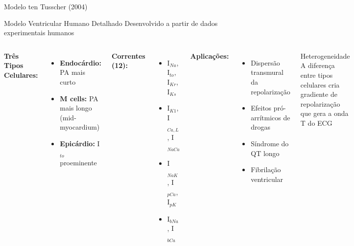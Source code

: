 \begin{frame}{Modelo ten Tusscher (2004)}
\begin{block}{Modelo Ventricular Humano Detalhado}
Desenvolvido a partir de dados experimentais humanos
\end{block}

\vspace{0.3cm}

\begin{columns}
\textbf{Três Tipos Celulares:}
\begin{itemize}
    \item \textbf{Endocárdio:} PA mais curto
    \item \textbf{M cells:} PA mais longo (mid-myocardium)
    \item \textbf{Epicárdio:} I$_{to}$ proeminente
\end{itemize}

\vspace{0.3cm}

\textbf{Correntes (12):}
\begin{itemize}
    \item I$_{Na}$, I$_{to}$, I$_{Kr}$, I$_{Ks}$
    \item I$_{K1}$, I$_{Ca,L}$, I$_{NaCa}$
    \item I$_{NaK}$, I$_{pCa}$, I$_{pK}$
    \item I$_{bNa}$, I$_{bCa}$
\end{itemize}

\textbf{Aplicações:}
\begin{itemize}
    \item Dispersão transmural da repolarização
    \item Efeitos pró-arrítmicos de drogas
    \item Síndrome do QT longo
    \item Fibrilação ventricular
\end{itemize}

\vspace{0.3cm}

\begin{exampleblock}{Heterogeneidade}
A diferença entre tipos celulares cria gradiente de repolarização que gera a onda T do ECG
\end{exampleblock}
\end{columns}

\vspace{0.3cm}

\end{frame}


